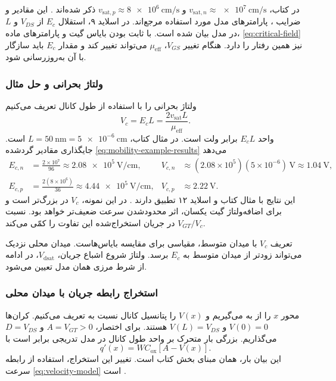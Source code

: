 در کتاب، \(v_{\mathrm{sat},n}\approx\qty{e7}{\centi\metre\per\second}\)
و \(v_{\mathrm{sat},p}\approx\qty{8e6}{\centi\metre\per\second}\) ذکر
شده‌اند \cite[صفحه چاپی ۷۶]{weste}. این مقادیر و ضرایب ،
پارامترهای مدل مورد استفاده مرجع‌اند. در اسلاید ۹، استقلال \(E_c\) از
\(V_{DS}\) و \(L\) در مدل بیان شده است. با ثابت بودن بایاس گیت و پارامترهای
ماده، \eqref{eq:critical-field} نیز همین رفتار را دارد. هنگام تغییر
\(V_{GS}\)، \(\mu_{\mathrm{eff}}\) می‌تواند تغییر کند و مقدار \(E_c\)
باید سازگار با آن به‌روزرسانی شود.

\subsubsection*{ولتاژ بحرانی و حل مثال }
ولتاژ بحرانی را با استفاده از طول کانال تعریف می‌کنیم
\begin{equation}
 V_c=E_cL=\frac{2v_{\mathrm{sat}}L}{\mu_{\mathrm{eff}}}.
 \label{eq:critical-voltage}
\end{equation}
واحد \(E_cL\) برابر ولت است. در مثال کتاب، \(L=\qty{50}{\nano\metre}
=\qty{5e-6}{\centi\metre}\) است. جایگذاری مقادیر گرد‌شده
\eqref{eq:mobility-example-results} می‌دهد
\begin{align*}
 E_{c,n}&=\frac{2\times10^7}{96}
 \approx\qty{2.08e5}{\volt\per\centi\metre},
 &V_{c,n}&\approx(2.08\times10^5)(5\times10^{-6})\,\unit{\volt}
 \approx\qty{1.04}{\volt},\\
 E_{c,p}&=\frac{2(8\times10^6)}{36}
 \approx\qty{4.44e5}{\volt\per\centi\metre},
 &V_{c,p}&\approx\qty{2.22}{\volt}.
\end{align*}
این نتایج با مثال  کتاب و اسلاید ۱۲ تطبیق دارند
\cite{weste,nonideal}. در این نمونه، \(V_c\) در  بزرگ‌تر است و
برای اضافه‌ولتاژ گیت یکسان، اثر محدودشدن سرعت ضعیف‌تر خواهد بود. نسبت
\(V_{GT}/V_c\) در جریان استخراج‌شده این تفاوت را کمّی می‌کند.

تعریف \(V_c\) با میدان متوسط، مقیاسی برای مقایسه بایاس‌هاست. میدان محلی
نزدیک  می‌تواند زودتر از میدان متوسط به \(E_c\) برسد.
ولتاژ شروع اشباع جریان، \(V_{\mathrm{dsat}}\)، در ادامه از شرط مرزی همان
مدل تعیین می‌شود.

\subsubsection*{استخراج رابطه جریان با میدان محلی}
محور \(x\) را از  به  می‌گیریم و \(V(x)\) را
پتانسیل کانال نسبت به  تعریف می‌کنیم. کران‌ها
\(V(0)=0\) و \(V(L)=V_{DS}\) هستند. برای اختصار،
\(A=V_{GT}>0\) و \(D=V_{DS}\) می‌گذاریم. بزرگی بار متحرک بر واحد
طول کانال در مدل تدریجی برابر است با
\begin{equation}
 q'(x)=WC_{\mathrm{ox}}[A-V(x)].
 \label{eq:local-charge}
\end{equation}
این بیان بار، همان مبنای بخش  کتاب است. تغییر این استخراج،
استفاده از رابطه سرعت \eqref{eq:velocity-model} است
\cite[بخش‌های  و ]{weste}.

